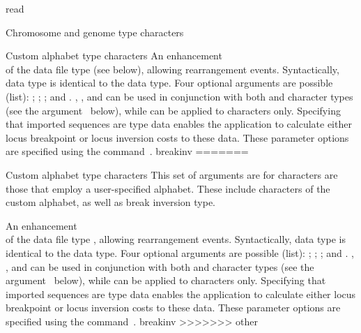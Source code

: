 \begin{command}{read}{}
\begin{arguments}
\begin{argumentgroup}{Chromosome and genome type characters}
\begin{argumentgroup}{Custom alphabet type characters}
	{An enhancement \\ of the data file type  (see below), allowing
            rearrangement events. Syntactically,  data type is identical to the
             data type.  Four optional arguments are possible (\poylident list): 
            ;  ;  ;  and  .
            , , and  can be used in conjunction
            with both  and  character types 
            (see the argument~ below), 
            while  can be applied to  characters only.
            Specifying that imported sequences are  type data enables
            the application to calculate  either locus breakpoint or locus inversion costs to these data.  These parameter
            options are specified using the command~.} 
            {breakinv}
=======
        \begin{argumentgroup}{Custom alphabet type characters}
            This set of arguments are for characters are those that employ a
            user-specified alphabet. These include characters of the custom
            alphabet, as well as break inversion type.
    
                {An enhancement \\ of the data file type , allowing
                rearrangement events. Syntactically,  data type is identical to the
                 data type.  Four optional arguments are possible (\poylident list): 
                ;  ;  ;  and  .
                , , and  can be used in conjunction
                with both  and  character types (see the argument~ below), 
                while  can be applied to  characters only.
                Specifying that imported sequences are  type data enables
                the application to calculate  either locus breakpoint or locus inversion costs to these data.  These parameter
                options are specified using the command~.} 
                {breakinv}
>>>>>>> other
           

\end{argumentgroup}
\end{argumentgroup}
\end{argumentgroup}
\end{arguments}
\end{command}
